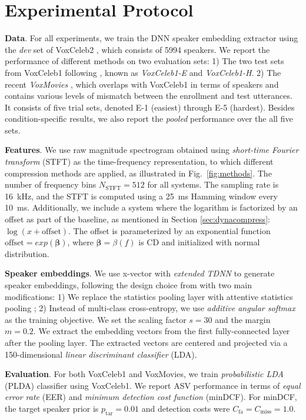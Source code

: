 \documentclass{article}
\begin{document}
\section{Experimental Protocol}
\label{sec:experiments}
\textbf{Data}. For all experiments, we train the DNN speaker embedding extractor using the \emph{dev} set of VoxCeleb2 \cite{voxceleb2}, which consists of 5994 speakers. We report the performance of different methods on two evaluation sets: 1) The two test sets from VoxCeleb1 \cite{voxceleb1} following \cite{voxsrc2019}, known as \emph{VoxCeleb1-E} and \emph{VoxCeleb1-H}. 2) The recent \emph{VoxMovies} \cite{voxmovies}, which overlaps with VoxCeleb1 in terms of speakers and contains various levels of mismatch between the enrollment and test utterances. It consists of five trial sets, denoted E-1 (easiest) through E-5 (hardest). Besides condition-specific results, we also report the \emph{pooled} performance over the all five sets. 

\textbf{Features}. We use raw magnitude spectrogram obtained using \emph{short-time Fourier transform} (STFT) as the time-frequency representation, to which different compression methods are applied, as illustrated in Fig.~\ref{fig:methods}. The number of frequency bins $N_{\mathrm{STFT}}=512$ for all systems. The sampling rate is 16~kHz, and the STFT is computed using a 25~ms Hamming window every 10~ms.
Additionally, we include a system where the logarithm is factorized by an offset as part of the baseline, as mentioned in Section \ref{sec:dynacompress}: $\log(x + \mathrm{offset})$. The offset is parameterized by an exponential function $\mathrm{offset} = exp(\boldsymbol{\beta})$, where $\boldsymbol{\beta} = \beta(f)$ is CD and initialized with normal distribution.

\textbf{Speaker embeddings}. We use x-vector with \emph{extended TDNN} to generate speaker embeddings, following the design choice from \cite{Snyder_etdnn_2019} with two main modifications: 1) We replace the statistics pooling layer with attentive statistics pooling \cite{astats_pooling}; 2) Instead of multi-class cross-entropy, we use \emph{additive angular softmax} \cite{aam_softmax} as the training objective. We set the scaling factor $s=30$ and the margin $m=0.2$. We extract the embedding vectors from the first fully-connected layer after the pooling layer. The extracted vectors are centered and projected via a 150-dimensional \emph{linear discriminant classifier} (LDA).

\textbf{Evaluation}. For both VoxCeleb1 and VoxMovies, we train \emph{probabilistic LDA} (PLDA) classifier using VoxCeleb1. We report ASV performance in terms of \emph{equal error rate} (EER) and \emph{minimum detection cost function} (minDCF). For minDCF, the target speaker prior is $p_{\mathrm{tar}} = 0.01$ and detection costs were $C_\text{fa} = C_\text{miss} = 1.0$.
\end{document}
